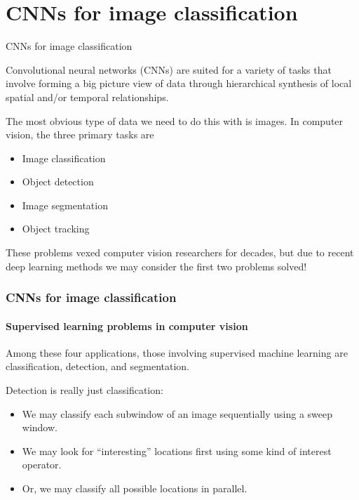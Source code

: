 \documentclass{beamer}
\begin{document}
\section{CNNs for image classification}

\begin{frame}{CNNs for image classification}

Convolutional neural networks (CNNs) are suited for a variety of tasks
that involve forming a \alert{big picture} view of data through
\alert{hierarchical synthesis of local spatial and/or temporal
  relationships}.

\medskip

The most obvious type of data we need to do this with is
\alert{images}.  In computer vision, the three primary tasks are
\begin{itemize}
\item Image classification
\item Object detection
\item Image segmentation
\item Object tracking
\end{itemize}
These problems vexed computer vision researchers for decades, but due
to recent deep learning methods we may consider the first two problems
\alert{solved}!

\end{frame}


\begin{frame}
  \frametitle{CNNs for image classification}
  \framesubtitle{Supervised learning problems in computer vision}

  Among these four applications, those involving supervised machine
  learning are \alert{classification}, \alert{detection}, and
  \alert{segmentation}.

  \medskip

  \alert{Detection is really just classification}:
  \begin{itemize}
  \item We may classify each subwindow of an image sequentially using
    a sweep window.
  \item We may look for ``interesting'' locations first using some
    kind of interest operator.
  \item Or, we may classify all possible locations in parallel.
  \end{itemize}

\end{frame}
\end{document}
